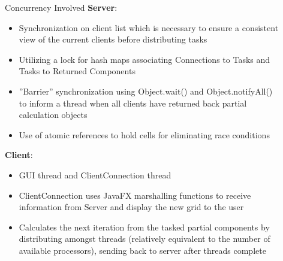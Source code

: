 \documentclass[final]{beamer}
\newlength{\sepwid}
\newlength{\onecolwid}
\newlength{\twocolwid}
\begin{document}
\begin{frame}[t]
\begin{columns}[t]
\begin{column}{\twocolwid}
\begin{columns}[t,totalwidth=\twocolwid]
\begin{column}{\twocolwid}

\end{column} %

\end{columns} %

\end{column} %

\begin{column}{\sepwid}\end{column} %

\begin{column}{\onecolwid} %

\begin{block}{Concurrency Involved}
\textbf{Server}:
\begin{itemize}
\item Synchronization on client list which is necessary to ensure a consistent view of the current clients before distributing tasks
\item Utilizing a lock for hash maps associating Connections to Tasks and Tasks to Returned Components
\item ''Barrier'' synchronization using Object.wait() and Object.notifyAll() to inform a thread when all clients have returned back partial calculation objects
\item Use of atomic references to hold cells for eliminating race conditions
\end{itemize}
\textbf{Client}:
\begin{itemize}
\item GUI thread and ClientConnection thread
\item ClientConnection uses JavaFX marshalling functions to receive information from Server and display the new grid to the user
\item Calculates the next iteration from the tasked partial components by distributing amongst threads (relatively equivalent to the number of available processors), sending back to server after threads complete
\end{itemize}
\end{block}



\end{column}
\end{columns}
\end{frame}
\end{document}
